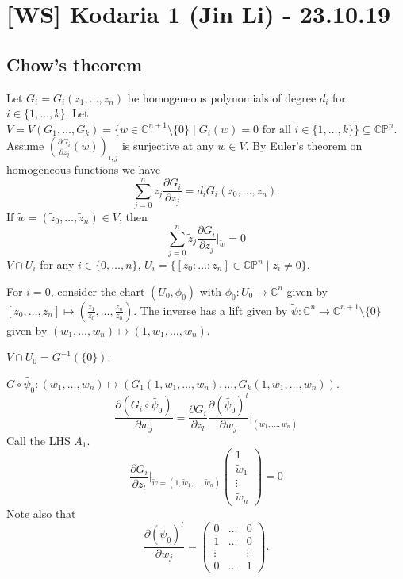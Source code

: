 \documentclass[12pt]{article}
\theoremstyle{darkgreentheorem}
\theoremstyle{darkbluedefinition}
\theoremstyle{darkredexample}
\theoremstyle{remark}
\newcommand{\1}{\mathbbm{1}}
\newcommand{\C}{\mathbb{C}}
\newcommand{\CP}{\mathbb{CP}}
\begin{document}
\section{[WS] Kodaria 1 (Jin Li) - 23.10.19}

\subsection{Chow's theorem}

Let $G_{i}=G_{i}(z_{1},\ldots,z_{n})$ be homogeneous polynomials of degree $d_{i}$ for $i\in \{1,\ldots,k\}$.
Let $V=V(G_{1},\ldots,G_{k})=\{w\in \C^{n+1}\setminus \{0 \}\mid G_{i}(w)=0 \text{ for all }i\in \{1,\ldots,k\}\}\subseteq \CP^{n}$.
Assume $(\frac{\partial G_{i}}{\partial z_{j}}(w))_{i,j}$ is surjective at any $w\in V$.
By Euler's theorem on homogeneous functions we have
\[ \sum_{j=0}^{n}z_{j}\frac{\partial G_{i}}{\partial z_{j}}=d_{i}G_{i}(z_{0},\ldots,z_{n}). \]
If $\tilde{w}=(\tilde{z}_{0},\ldots,\tilde{z}_{n})\in V$, then
\[ \sum_{j=0}^{n}\tilde{z}_{j}\frac{\partial G_{i}}{\partial z_{j}}|_{\tilde{w}}=0\]
$V\cap U_{i}$ for any $i\in \{0,\ldots,n\}$, $U_{i}=\{[z_{0}:\ldots:z_{n}]\in \CP^{n}\mid z_{i}\neq 0\}$.

For $i=0$, consider the chart $(U_{0},\phi_{0})$ with $\phi_{0}\colon U_{0}\to \C^{n}$ given by $[z_{0},\ldots,z_{n}]\mapsto (\frac{z_{1}}{z_{0}},\ldots,\frac{z_{n}}{z_{0}})$.
The inverse has a lift given by $\tilde{\psi}\colon \C^{n}\to \C^{n+1}\setminus \{0\}$ given by $(w_{1},\ldots,w_{n})\mapsto (1,w_{1},\ldots,w_{n})$.
\begin{center}
\end{center}
$V\cap U_{0}=G^{-1}(\{0\})$.

$G\circ \tilde{\psi_{0}}\colon (w_{1},\ldots,w_{n})\mapsto (G_{1}(1,w_{1},\ldots,w_{n}),\ldots,G_{k}(1,w_{1},\ldots,w_{n}))$.
\[ \frac{\partial (G_{i}\circ \tilde{\psi_{0}})}{\partial w_{j}} = \frac{\partial G_{i}}{\partial z_{l}}\frac{\partial(\tilde{\psi_{0}})^{l}}{\partial w_{j}}|_{(\tilde{w_{1}},\ldots,\tilde{w_{n}})} \]
Call the LHS $A_{1}$.
\begin{equation}
    \frac{\partial G_{i}}{\partial z_{l}}|_{\tilde{w}=(1,\tilde{w}_{1},\ldots,\tilde{w}_{n})}\begin{pmatrix} 1 \\ \tilde{w}_{1} \\ \vdots \\ \tilde{w}_{n} \end{pmatrix} = 0
\end{equation}
Note also that
\[\frac{\partial (\tilde{\psi_{0}})^{l}}{\partial w_{j}}=\begin{pmatrix} 0 & \ldots & 0 \\ 1 & \ldots & 0\\ \vdots & & \vdots \\ 0 & \ldots & 1 \end{pmatrix}.\]
\end{document}
